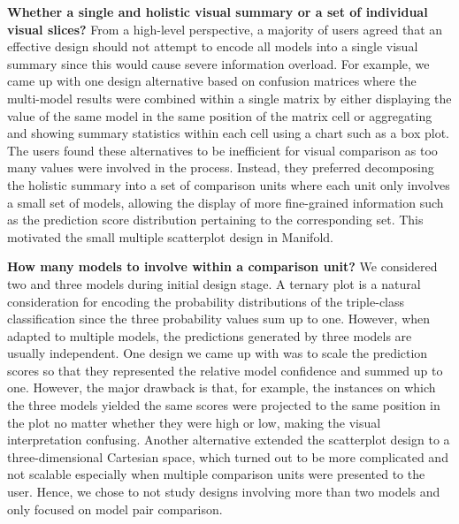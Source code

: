 \documentclass[preprint,journal]{vgtc}       %
\newcommand{\techname}{Manifold}
\begin{document}
\textbf{Whether a single and holistic visual summary or a set of individual visual slices?} From a high-level perspective, a majority of users agreed that an effective design should not attempt to encode all models into a single visual summary since this would cause severe information overload. For example, we came up with one design alternative based on confusion matrices where the multi-model results were combined within a single matrix by either displaying the value of the same model in the same position of the matrix cell or aggregating and showing summary statistics within each cell using a chart such as a box plot. The users found these alternatives to be inefficient for visual comparison as too many values were involved in the process. Instead, they preferred decomposing the holistic summary into a set of comparison units where each unit only involves a small set of models, allowing the display of more fine-grained information such as the prediction score distribution pertaining to the corresponding set. This motivated the small multiple scatterplot design in \techname.

\textbf{How many models to involve within a comparison unit?} We considered two and three models during initial design stage. A ternary plot is a natural consideration for encoding the probability distributions of the triple-class classification since the three probability values sum up to one. However, when adapted to multiple models, the predictions generated by three models are usually independent. One design we came up with was to scale the prediction scores so that they represented the relative model confidence and summed up to one. However, the major drawback is that, for example, the instances on which the three models yielded the same scores were projected to the same position in the plot no matter whether they were high or low, making the visual interpretation confusing. Another alternative extended the scatterplot design to a three-dimensional Cartesian space, which turned out to be more complicated and not scalable especially when multiple comparison units were presented to the user. Hence, we chose to not study designs involving more than two models and only focused on model pair comparison.

\end{document}

